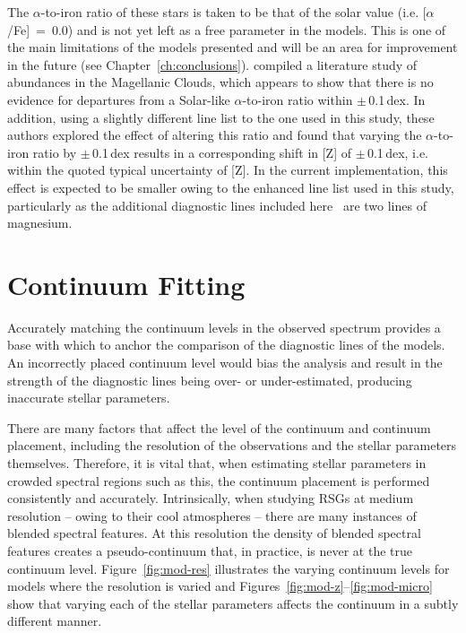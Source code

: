 The $\alpha$-to-iron ratio of these stars is taken to be that of the solar value (i.e. [$\alpha$/Fe]~=~0.0) and is not yet left as a free parameter in the models.
This is one of the main limitations of the models presented and will be an area for improvement in the future (see Chapter~\ref{ch:conclusions}).
\cite{2015ApJ...806...21D} compiled a literature study of abundances in the Magellanic Clouds, which appears to show that there is no evidence for departures from a Solar-like $\alpha$-to-iron ratio within $\pm$\,0.1\,dex.
In addition, using a slightly different line list to the one used in this study, these authors explored the effect of altering this ratio and found that varying the $\alpha$-to-iron ratio by $\pm$\,0.1\,dex results in a corresponding shift in [Z] of $\pm$\,0.1\,dex, i.e. within the quoted typical uncertainty of [Z].
In the current implementation, this effect is expected to be smaller owing to the enhanced line list used in this study, particularly as the additional diagnostic lines included here~\cite[in comparison with][]{2015ApJ...806...21D} are two lines of magnesium.

\section{Continuum Fitting} %
\label{sec:continuum_fitting}

Accurately matching the continuum levels in the observed
spectrum provides a base with which to anchor the comparison of the diagnostic lines of the models.
An incorrectly placed continuum level would bias the analysis and result in the
strength of the diagnostic lines being over- or under-estimated, producing inaccurate stellar parameters.

There are many factors that affect the level of the continuum and continuum placement,
including the resolution of the observations and the stellar parameters themselves.
Therefore, it is vital that, when estimating stellar parameters in crowded spectral regions such as this, the continuum placement is performed
consistently and accurately.
Intrinsically, when studying RSGs at medium resolution -- owing to their cool atmospheres --
there are many instances of blended spectral features.
At this resolution the density of blended spectral features creates a pseudo-continuum that, in practice,
is never at the true continuum level.
Figure~\ref{fig:mod-res} illustrates the varying continuum levels for models where the resolution is varied and
Figures~\ref{fig:mod-z}--\ref{fig:mod-micro} show that varying each of the stellar parameters affects the continuum in a subtly different manner.

